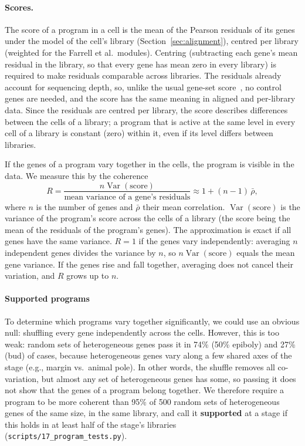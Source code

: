 \documentclass[11pt,a4paper]{article}
\begin{document}
\paragraph{Scores.} The score of a program in a cell is the mean of the Pearson residuals of its genes under the model of the cell's library (Section~\ref{sec:alignment}), centred per library (weighted for the Farrell et al.\ modules). Centring (subtracting each gene's mean residual in the library, so that every gene has mean zero in every library) is required to make residuals comparable across libraries. The residuals already account for sequencing depth, so, unlike the usual gene-set score~\cite{wolf2018scanpy}, no control genes are needed, and the score has the same meaning in aligned and per-library data. Since the residuals are centred per library, the score describes differences between the cells of a library; a program that is active at the same level in every cell of a library is constant (zero) within it, even if its level differs between libraries.

If the genes of a program vary together in the cells, the program is visible in the data. We measure this by the coherence
\[
	R = \frac{n \operatorname{Var}(\text{score})}{\text{mean variance of a gene's residuals}} \approx 1 + (n-1)\,\bar\rho,
\]
where $n$ is the number of genes and $\bar\rho$ their mean correlation. $\operatorname{Var}(\text{score})$ is the variance of the program's score across the cells of a library (the score being the mean of the residuals of the program's genes). The approximation is exact if all genes have the same variance. $R = 1$ if the genes vary independently: averaging $n$ independent genes divides the variance by $n$, so $n \operatorname{Var}(\text{score})$ equals the mean gene variance. If the genes rise and fall together, averaging does not cancel their variation, and $R$ grows up to $n$.

\paragraph{Supported programs}

To determine which programs vary together significantly, we could use an obvious null: shuffling every gene independently across the cells. However, this is too weak: random sets of heterogeneous genes pass it in 74\% (50\% epiboly) and 27\% (bud) of cases, because heterogeneous genes vary along a few shared axes of the stage (e.g., margin vs.\ animal pole). In other words, the shuffle removes all co-variation, but almost any set of heterogeneous genes has some, so passing it does not show that the genes of a program belong together. We therefore require a program to be more coherent than 95\% of 500 random sets of heterogeneous genes of the same size, in the same library, and call it \textbf{supported} at a stage if this holds in at least half of the stage's libraries (\nolinkurl{scripts/17_program_tests.py}).
\end{document}
